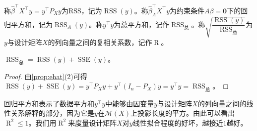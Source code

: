\begin{definition}
	称$\hat{\beta}^{\top}X^{\top}y=y^{\top}P_Xy$为\gls{RSS}，记为$\operatorname{RSS}(y)$。称$\hat{\beta}_A^{\top}X^{\top}y$为约束条件$A\beta=\mathbf{0}$下的回归平方和，记为$\operatorname{RSS}_A(y)$。称$y^{\top}y$为总平方和，记作$\operatorname{RSS}_{\text{总}}$。称$\sqrt{\dfrac{\operatorname{RSS}(y)}{\operatorname{RSS}_{\text{总}}}}$为$y$与设计矩阵$X$的列向量之间的复相关系数，记作$\operatorname{R}$。
\end{definition}
\begin{property}\label{prop:RSS=RSSbeta+SSE}
	$\operatorname{RSS}_{\text{总}}=\operatorname{RSS}(y)+\operatorname{SSE}(y)$。
\end{property}
\begin{proof}
	由\cref{prop:ehat}(2)可得$\operatorname{RSS}(y)+\operatorname{SSE}(y)=y^{\top}P_Xy+y^{\top}(I_n-P_X)y=y^{\top}y=\operatorname{RSS}_{\text{总}}$。
\end{proof}
\begin{note}
	回归平方和表示了数据平方和$y^{\top}y$中能够由因变量$y$与设计矩阵$X$的列向量之间的线性关系解释的部分，因为它是$y$在$\mathcal{M}(X)$上投影长度的平方。由此可以看出$\operatorname{R}^2\leqslant1$。我们用$\operatorname{R}^2$来度量设计矩阵$X$对$y$线性拟合程度的好坏，越接近$1$越好。
\end{note}

